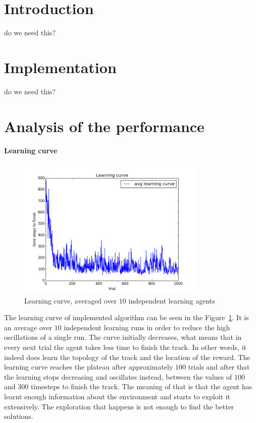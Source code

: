\section{Introduction}
do we need this?

\section{Implementation}
do we need this?

\section{Analysis of the performance}

\paragraph{Learning curve}

\begin{figure}[h!]
\centering
\includegraphics[width=0.8\textwidth]{figures/learning_curve.png}
\caption{\label{fig:lcurve}Learning curve, averaged over $10$ independent
learning agents}
\end{figure}

The learning curve of implemented algorithm can be seen in the
Figure~\ref{fig:lcurve}. It is an average over $10$ independent learning runs in
order to reduce the high oscillations of a single run. The curve initially
decreases, what means that in every next trial the agent takes less time to
finish the track. In other words, it indeed does learn the topology of the track
and the location of the reward. The learning curve reaches the plateau after
approximately $100$ trials and after that the learning stops decreasing and
oscillates instead, between the values of $100$ and $300$ timesteps to finish
the track. The meaning of that is that the agent has learnt enough information
about the environment and starts to exploit it extensively. The exploration that
happens is not enough to find the better solutions.

